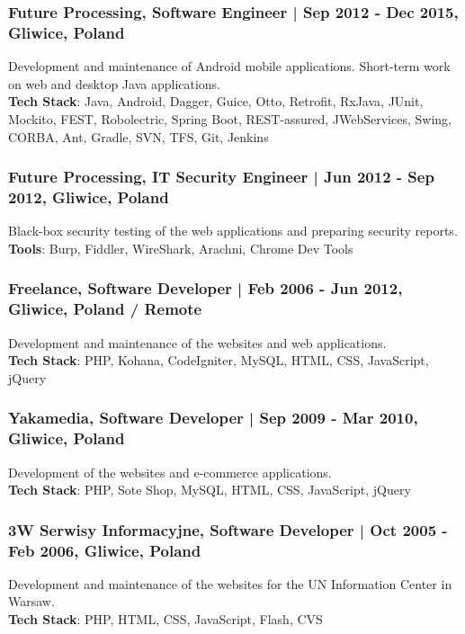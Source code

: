 \documentclass[8pt]{extarticle}
\begin{document}
      \subsubsection*{\normalsize{Future Processing, Software Engineer | Sep 2012 - Dec 2015, Gliwice, Poland}}
      Development and maintenance of Android mobile applications. Short-term work on web and desktop Java applications.\\
      \textbf{Tech Stack}: Java, Android, Dagger, Guice, Otto, Retrofit, RxJava,
      JUnit, Mockito, FEST, Robolectric, Spring Boot, REST-assured, JWebServices,
      Swing, CORBA, Ant, Gradle, SVN, TFS, Git, Jenkins

      \subsubsection*{\normalsize{Future Processing, IT Security Engineer | Jun 2012 - Sep 2012, Gliwice, Poland}}
      Black-box security testing of the web applications and preparing security reports.\\
      \textbf{Tools}: Burp, Fiddler, WireShark, Arachni, Chrome Dev Tools

      \subsubsection*{\normalsize{Freelance, Software Developer | Feb 2006 - Jun 2012, Gliwice, Poland / Remote}}
      Development and maintenance of the websites and web applications.\\
      \textbf{Tech Stack}: PHP, Kohana, CodeIgniter, MySQL, HTML, CSS, JavaScript, jQuery

      \subsubsection*{\normalsize{Yakamedia, Software Developer | Sep 2009 - Mar 2010, Gliwice, Poland}}
      Development of the websites and e-commerce applications.\\
      \textbf{Tech Stack}: PHP, Sote Shop, MySQL, HTML, CSS, JavaScript, jQuery

      \subsubsection*{\normalsize{3W Serwisy Informacyjne, Software Developer | Oct 2005 - Feb 2006, Gliwice, Poland}}
      Development and maintenance of the websites for the UN Information Center in Warsaw.\\
      \textbf{Tech Stack}: PHP, HTML, CSS, JavaScript, Flash, CVS
\end{document}

